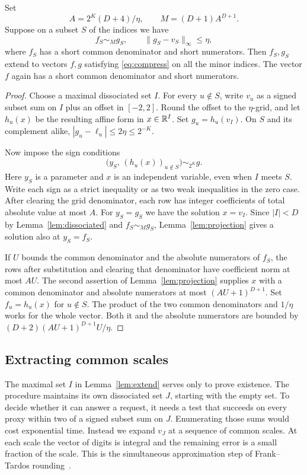 \begin{lemma}[Extension]\label{lem:extend}
Set
\[
 A=2^K(D+4)/\eta,\qquad M=(D+1)A^{D+1}.
\]
Suppose on a subset \(S\) of the indices we have
\begin{equation}\label{eq:answered}
 f_S\sim_M g_S,\qquad \|g_S-v_S\|_\infty\le\eta ,
\end{equation}
where \(f_S\) has a short common denominator and short numerators.
Then \(f_S,g_S\) extend to vectors \(f,g\) satisfying
\eqref{eq:compress} on all the minor indices. The vector \(f\) again
has a short common denominator and short numerators.
\end{lemma}
\begin{proof}
Choose a maximal dissociated set \(I\). For every \(u\notin S\),
write \(v_u\) as a signed subset sum on \(I\) plus an offset in
\([-2,2]\). Round the offset to the \(\eta\)-grid, and let \(h_u(x)\)
be the resulting affine form in \(x\in\mathbb R^I\). Set
\(g_u=h_u(v_I)\). On \(S\) and its complement alike,
\(|g_u-\ell_u|\le 2\eta\le2^{-K}\).

Now impose the sign conditions
\[
  \big(y_S,\,(h_u(x))_{u\notin S}\big)\sim_{2^K}g .
\]
Here \(y_S\) is a parameter and \(x\) is an independent variable,
even when \(I\) meets \(S\). Write each sign as a strict inequality or
as two weak inequalities in the zero case. After clearing the grid
denominator, each row has integer coefficients of total absolute
value at most \(A\). For \(y_S=g_S\) we have the solution \(x=v_I\).
Since \(|I|<D\) by Lemma~\ref{lem:dissociated} and \(f_S\sim_M g_S\),
Lemma~\ref{lem:projection} gives a solution also at \(y_S=f_S\).

If \(U\) bounds the common denominator and the absolute numerators
of \(f_S\), the rows after substitution and clearing that denominator
have coefficient norm at most \(AU\). The second assertion of
Lemma~\ref{lem:projection} supplies \(x\) with a common denominator
and absolute numerators at most \((AU+1)^{D+1}\). Set \(f_u=h_u(x)\)
for \(u\notin S\). The product of the two common denominators and
\(1/\eta\) works for the whole vector. Both it and the absolute
numerators are bounded by \((D+2)(AU+1)^{D+1}U/\eta\).
\end{proof}

\subsection{Extracting common scales}

The maximal set \(I\) in Lemma~\ref{lem:extend} serves only to prove
existence. The procedure maintains its own dissociated set \(J\),
starting with the empty set. To decide whether it can answer a
request, it needs a test that succeeds on every proxy within two of
a signed subset sum on \(J\). Enumerating those sums would cost
exponential time. Instead we expand \(v_J\) at a sequence of common
scales. At each scale the vector of digits is integral and the
remaining error is a small fraction of the scale. This is the
simultaneous approximation step of Frank--Tardos rounding~\cite{FT}.

